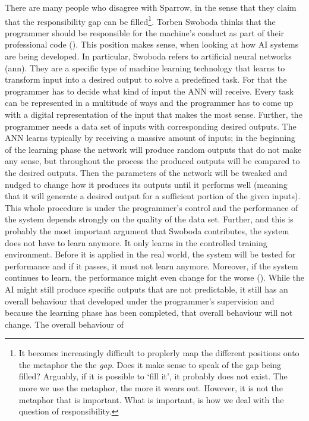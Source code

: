 \documentclass{article}
\begin{document}
There are many people who disagree with Sparrow, in the sense that they claim
that the responsibility gap can be filled\footnote{It becomes increasingly
	difficult to proplerly map the different positions onto the metaphor the
	the \textit{gap}. Does it make sense to speak of the gap being filled?
	Arguably, if it is possible to `fill it', it probably does not exist.
	The more we use the metaphor, the more it wears out. However, it is not
	the metaphor that is important. What is important, is how we deal with
	the question of responsibility.}.
Torben Swoboda thinks that the programmer should be responsible for the
machine's conduct as part of their professional code
(\cite{swoboda2017autonomous}). This position makes sense, when looking at how
AI systems are being developed. In particular, Swoboda refers to artificial
neural networks (\acrshort{ann}). They are a specific type of machine learning
technology that learns to transform input into a desired output to solve a
predefined task. For that the programmer has to decide what kind of input the ANN
will receive. Every task can be represented in a multitude of ways and the
programmer has to come up with a digital representation of the input that makes
the most sense. Further, the programmer needs a data set of inputs with
corresponding desired outputs. The ANN learns typically by receiving a massive
amount of inputs; in the beginning of the learning phase the network will
produce random outputs that do not make any sense, but throughout the process
the produced outputs will be compared to the desired outputs. Then the
parameters of the network will be tweaked and nudged to change how it produces
its outputs until it performs well (meaning that it will generate a desired
output for a sufficient portion of the given inputs). This whole procedure is
under the programmer's control and the performance of the system depends
strongly on the quality of the data set. Further, and this is probably the most
important argument that Swoboda contributes, the system does not have to learn
anymore. It only learns in the controlled training environment. Before it is
applied in the real world, the system will be tested for performance and if it
passes, it must not learn anymore. Moreover, if the system continues to learn,
the performance might even change for the worse (\cite[p.
307-309]{swoboda2017autonomous}). While the AI might still produce specific
outputs that are not predictable, it still has an overall behaviour that
developed under the programmer's supervision and because the learning phase has
been completed, that overall behaviour will not change. The overall behaviour of
\end{document}
